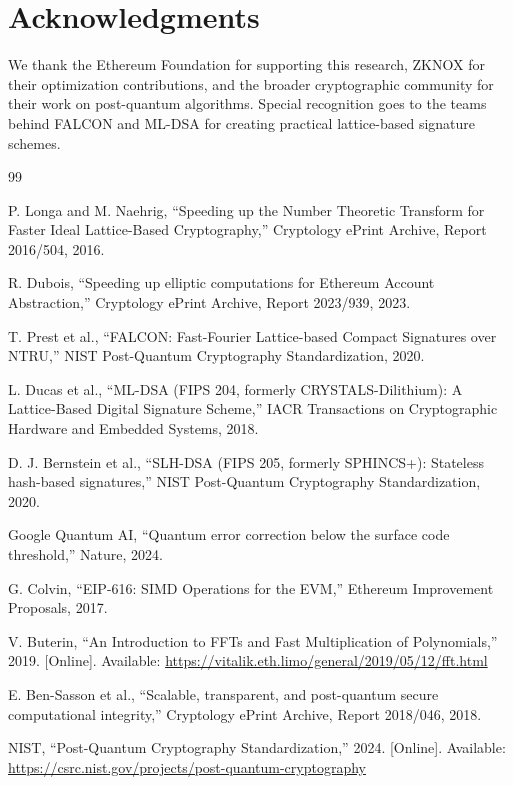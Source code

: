 \section*{Acknowledgments}


We thank the Ethereum Foundation for supporting this research, ZKNOX for their optimization contributions, and the broader cryptographic community for their work on post-quantum algorithms. Special recognition goes to the teams behind FALCON and ML-DSA for creating practical lattice-based signature schemes.

\begin{thebibliography}{99}

P. Longa and M. Naehrig, ``Speeding up the Number Theoretic Transform for Faster Ideal Lattice-Based Cryptography,'' Cryptology ePrint Archive, Report 2016/504, 2016.

R. Dubois, ``Speeding up elliptic computations for Ethereum Account Abstraction,'' Cryptology ePrint Archive, Report 2023/939, 2023.

T. Prest et al., ``FALCON: Fast-Fourier Lattice-based Compact Signatures over NTRU,'' NIST Post-Quantum Cryptography Standardization, 2020.

L. Ducas et al., ``ML-DSA (FIPS 204, formerly CRYSTALS-Dilithium): A Lattice-Based Digital Signature Scheme,'' IACR Transactions on Cryptographic Hardware and Embedded Systems, 2018.

D. J. Bernstein et al., ``SLH-DSA (FIPS 205, formerly SPHINCS+): Stateless hash-based signatures,'' NIST Post-Quantum Cryptography Standardization, 2020.

Google Quantum AI, ``Quantum error correction below the surface code threshold,'' Nature, 2024.

G. Colvin, ``EIP-616: SIMD Operations for the EVM,'' Ethereum Improvement Proposals, 2017.

V. Buterin, ``An Introduction to FFTs and Fast Multiplication of Polynomials,'' 2019. [Online]. Available: \url{https://vitalik.eth.limo/general/2019/05/12/fft.html}

E. Ben-Sasson et al., ``Scalable, transparent, and post-quantum secure computational integrity,'' Cryptology ePrint Archive, Report 2018/046, 2018.

NIST, ``Post-Quantum Cryptography Standardization,'' 2024. [Online]. Available: \url{https://csrc.nist.gov/projects/post-quantum-cryptography}

\end{thebibliography}

